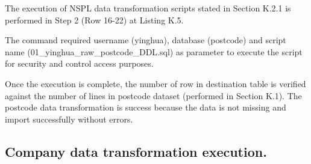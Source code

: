 The execution of NSPL data transformation scripts stated in Section K.2.1 is performed in Step 2 (Row 16-22) at Listing K.5. 

The command required username (yinghua), database (postcode) and script name (01\_yinghua\_raw\_postcode\_DDL.sql) as parameter to execute the script for security and control access purposes. 

Once the execution is complete, the number of row in destination table is verified against the number of lines in postcode dataset (performed in Section K.1). The postcode data transformation is success because the data is not missing and import successfully without errors. 

\newpage 

\subsection{Company data transformation execution.}


